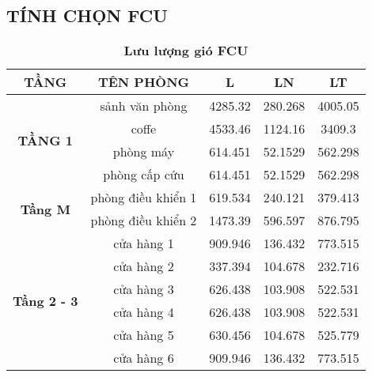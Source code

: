 \subsection{TÍNH CHỌN FCU}
\begin{table}[H]
	\centering
	\caption{\textbf{Lưu lượng gió FCU}}
	\begin{tabular}{|c|c|c|c|c|}
		\hline
		\textbf{TẦNG} & \textbf{TÊN PHÒNG} & \textbf{L } & \textbf{LN} & \textbf{LT} \bigstrut\\
		\hline
		\multirow{4}[8]{*}{\textbf{TẦNG 1}} & sảnh văn phòng & 4285.32 & 280.268 & 4005.05 \bigstrut\\
		\cline{2-5}      & coffe & 4533.46 & 1124.16 & 3409.3 \bigstrut\\
		\cline{2-5}      & phòng máy & 614.451 & 52.1529 & 562.298 \bigstrut\\
		\cline{2-5}      & phòng cấp cứu & 614.451 & 52.1529 & 562.298 \bigstrut\\
		\hline
		\multirow{2}[4]{*}{\textbf{Tầng M}} & phòng điều khiển 1 & 619.534 & 240.121 & 379.413 \bigstrut\\
		\cline{2-5}      & phòng điều khiển 2 & 1473.39 & 596.597 & 876.795 \bigstrut\\
		\hline
		\multirow{6}[12]{*}{\textbf{Tầng 2 - 3}} & cửa hàng 1 & 909.946 & 136.432 & 773.515 \bigstrut\\
		\cline{2-5}      & cửa hàng 2 & 337.394 & 104.678 & 232.716 \bigstrut\\
		\cline{2-5}      & cửa hàng 3 & 626.438 & 103.908 & 522.531 \bigstrut\\
		\cline{2-5}      & cửa hàng 4 & 626.438 & 103.908 & 522.531 \bigstrut\\
		\cline{2-5}      & cửa hàng 5 & 630.456 & 104.678 & 525.779 \bigstrut\\
		\cline{2-5}      & cửa hàng 6 & 909.946 & 136.432 & 773.515 \bigstrut\\
		\hline
	\end{tabular}%
	
\end{table}


